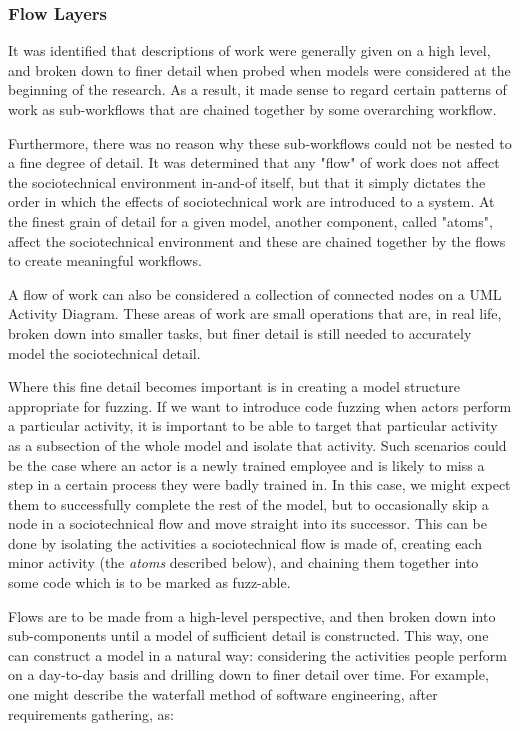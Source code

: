\subsubsection{Flow Layers}
It was identified that descriptions of work were generally given on a high level, and broken down to finer detail when probed when models were considered at the beginning of the research. As a result, it made sense to regard certain patterns of work as sub-workflows that are chained together by some overarching workflow. \par
Furthermore, there was no reason why these sub-workflows could not be nested to a fine degree of detail. It was determined that any "flow" of work does not affect the sociotechnical environment in-and-of itself, but that it simply dictates the order in which the effects of sociotechnical work are introduced to a system. At the finest grain of detail for a given model, another component, called "atoms", affect the sociotechnical environment and these are chained together by the flows to create meaningful workflows. \par
A flow of work can also be considered a collection of connected nodes on a UML Activity Diagram. These areas of work are small operations that are, in real life, broken down into smaller tasks, but finer detail is still needed to accurately model the sociotechnical detail\cite{Crabtree2000}. \par
Where this fine detail becomes important is in creating a model structure appropriate for fuzzing. If we want to introduce code fuzzing when actors perform a particular activity, it is important to be able to target that particular activity as a subsection of the whole model and isolate that activity. Such scenarios could be the case where an actor is a newly trained employee and is likely to miss a step in a certain process they were badly trained in. In this case, we might expect them to successfully complete the rest of the model, but to occasionally skip a node in a sociotechnical flow and move straight into its successor. This can be done by isolating the activities a sociotechnical flow is made of, creating each minor activity (the \emph{atoms} described below), and chaining them together into some code which is to be marked as fuzz-able.\par
Flows are to be made from a high-level perspective, and then broken down into sub-components until a model of sufficient detail is constructed. This way, one can construct a model in a natural way: considering the activities people perform on a day-to-day basis and drilling down to finer detail over time. For example, one might describe the waterfall method of software engineering, after requirements gathering, as: 
